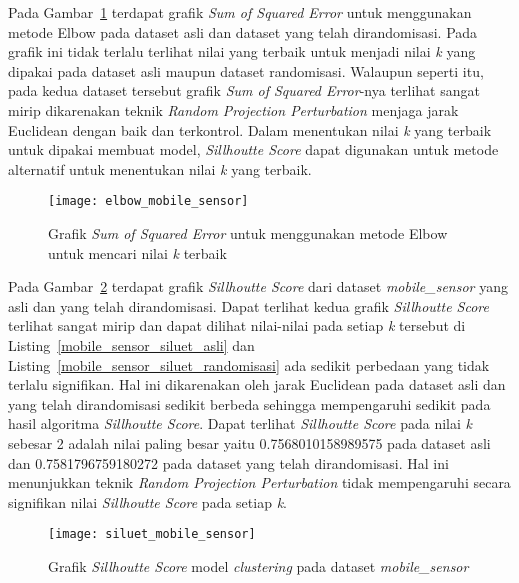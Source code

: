 Pada Gambar~\ref{fig:elbow_mobile_sensor} terdapat grafik \textit{Sum of Squared Error} untuk menggunakan metode Elbow pada dataset asli dan dataset yang telah dirandomisasi. Pada grafik ini tidak terlalu terlihat nilai yang terbaik untuk menjadi nilai \textit{k} yang dipakai pada dataset asli maupun dataset randomisasi. Walaupun seperti itu, pada kedua dataset tersebut grafik \textit{Sum of Squared Error}-nya terlihat sangat mirip dikarenakan teknik \textit{Random Projection Perturbation} menjaga jarak Euclidean dengan baik dan terkontrol. Dalam menentukan nilai \textit{k} yang terbaik untuk dipakai membuat model, \textit{Sillhoutte Score} dapat digunakan untuk metode alternatif untuk menentukan nilai \textit{k} yang terbaik.

\begin{figure}
	\centering
	\texttt{[image: elbow\_mobile\_sensor]}
	\caption{Grafik \textit{Sum of Squared Error} untuk menggunakan metode Elbow untuk mencari nilai \textit{k} terbaik}
	\label{fig:elbow_mobile_sensor}
\end{figure}

Pada Gambar~\ref{fig:siluet_mobile_sensor} terdapat grafik \textit{Sillhoutte Score} dari dataset \textit{mobile\_sensor} yang asli dan yang telah dirandomisasi. Dapat terlihat kedua grafik \textit{Sillhoutte Score} terlihat sangat mirip dan dapat dilihat nilai-nilai pada setiap \textit{k} tersebut di Listing~\ref{mobile_sensor_siluet_asli} dan Listing~\ref{mobile_sensor_siluet_randomisasi} ada sedikit perbedaan yang tidak terlalu signifikan. Hal ini dikarenakan oleh jarak Euclidean pada dataset asli dan yang telah dirandomisasi sedikit berbeda sehingga mempengaruhi sedikit pada hasil algoritma \textit{Sillhoutte Score}. Dapat terlihat \textit{Sillhoutte Score} pada nilai \textit{k} sebesar 2 adalah nilai paling besar yaitu 0.7568010158989575 pada dataset asli dan 0.7581796759180272 pada dataset yang telah dirandomisasi. Hal ini menunjukkan teknik \textit{Random Projection Perturbation} tidak mempengaruhi secara signifikan nilai \textit{Sillhoutte Score} pada setiap \textit{k}.

\begin{figure}
	\centering
	\texttt{[image: siluet\_mobile\_sensor]}
	\caption{Grafik \textit{Sillhoutte Score} model \textit{clustering} pada dataset \textit{mobile\_sensor}}
	\label{fig:siluet_mobile_sensor}
\end{figure}
	
